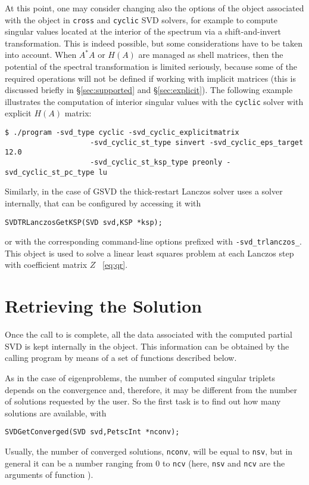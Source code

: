 At this point, one may consider changing also the options of the  object associated with the  object in \texttt{cross} and \texttt{cyclic} SVD solvers, for example to compute singular values located at the interior of the spectrum via a shift-and-invert transformation. This is indeed possible, but some considerations have to be taken into account. When $A^*A$ or $H(A)$ are managed as shell matrices, then the potential of the spectral transformation is limited seriously, because some of the required operations will not be defined if working with implicit matrices (this is discussed briefly in \S\ref{sec:supported} and \S\ref{sec:explicit}). The following example illustrates the computation of interior singular values with the \texttt{cyclic} solver with explicit $H(A)$ matrix:
\begin{Verbatim}[fontsize=\small]
	$ ./program -svd_type cyclic -svd_cyclic_explicitmatrix
                    -svd_cyclic_st_type sinvert -svd_cyclic_eps_target 12.0
                    -svd_cyclic_st_ksp_type preonly -svd_cyclic_st_pc_type lu
\end{Verbatim}

Similarly, in the case of GSVD the thick-restart Lanczos solver uses a  solver internally, that can be configured by accessing it with
	\begin{Verbatim}[fontsize=\small]
	SVDTRLanczosGetKSP(SVD svd,KSP *ksp);
	\end{Verbatim}
or with the corresponding command-line options prefixed with \texttt{-svd\_trlanczos\_}. This  object is used to solve a linear least squares problem at each Lanczos step with coefficient matrix $Z$
~\eqref{eq:qr}.

\section{Retrieving the Solution}

Once the call to  is complete, all the data associated with the computed partial SVD is kept internally in the  object. This information can be obtained by the calling program by means of a set of functions described below.

As in the case of eigenproblems, the number of computed singular triplets depends on the convergence and, therefore, it may be different from the number of solutions requested by the user. So the first task is to find out how many solutions are available, with
	\begin{Verbatim}[fontsize=\small]
	SVDGetConverged(SVD svd,PetscInt *nconv);
	\end{Verbatim}
Usually, the number of converged solutions, \texttt{nconv}, will be equal to \texttt{nsv}, but in general it can be a number ranging from 0 to \texttt{ncv} (here, \texttt{nsv} and \texttt{ncv} are the arguments of function ).

